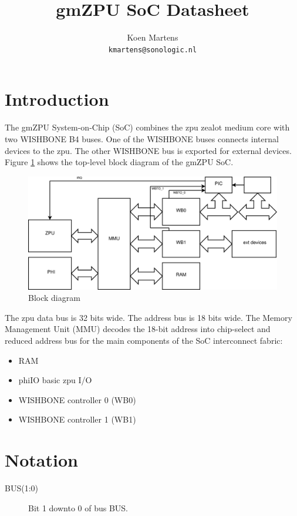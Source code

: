 \documentclass[a4paper,twocolumn,12pt]{article}
\title{gmZPU SoC Datasheet}
\author{Koen Martens\\
        \texttt{kmartens@sonologic.nl}}
\begin{document}
\maketitle

\section{Introduction}

The gmZPU System-on-Chip (SoC) combines the zpu zealot medium core \cite{zpu} with two WISHBONE B4 \cite{wishbone} buses. One of the WISHBONE buses connects internal devices to the zpu. The other WISHBONE bus is exported for external devices. Figure \ref{fig:block_diagram} shows the top-level block diagram of the gmZPU SoC.

\begin{figure}
    \centering
    \includegraphics[width=13cm]{gmzpu_block_diagram}
    \caption{Block diagram}
    \label{fig:block_diagram}
\end{figure}

The zpu data bus is 32 bits wide. The address bus is 18 bits wide. The Memory Management Unit (MMU) decodes the 18-bit address into chip-select and reduced address bus for the main components of the SoC interconnect fabric:

\begin{itemize}
    \item RAM
    \item phiIO basic zpu I/O
    \item WISHBONE controller 0 (WB0)
    \item WISHBONE controller 1 (WB1)
\end{itemize}

\section{Notation}

\begin{description}
    \item[BUS(1:0)] Bit 1 downto 0 of bus BUS.
\end{description}
\end{document}
